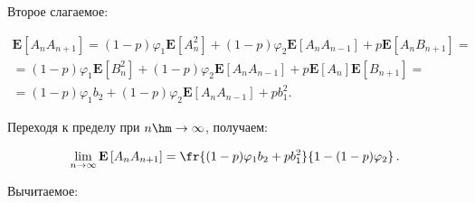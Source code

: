 Второе слагаемое:

\begin{multline*}

\mathbf{E}\left[A_n A_{n+1}\right]=

(1-p)\varphi_1\mathbf{E}\left[A_n^2\right]+(1-p)\varphi_2\mathbf{E}\left[A_n A_{n-1}\right]+

p\mathbf{E}\left[A_n B_{n+1}\right]={}\\[1.5pt]

{}=(1-p)\varphi_1\mathbf{E}\left[B_n^2\right]+(1-p)\varphi_2\mathbf{E}

\left[A_n A_{n-1}\right]+p\mathbf{E}\left[A_n\right]\mathbf{E}\left[B_{n+1}\right]={}\\[1.5pt]

{}=(1-p)\varphi_1 b_2+(1-p)\varphi_2\mathbf{E}\left[A_n A_{n-1}\right]+pb_1^2.

\end{multline*}

Переходя к пределу при $n\hm\to\infty$, получаем:

\begin{equation*}

\lim_{n\to\infty}\mathbf{E}\left[A_n A_{n+1}\right]=

\fr{(1-p)\varphi_1 b_2+pb_1^2}{1-(1-p)\varphi_2}\,.

\end{equation*}

Вычитаемое:

